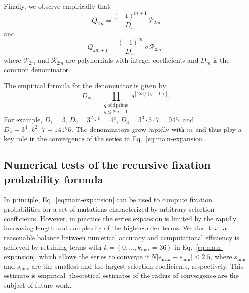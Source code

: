 \documentclass[9pt,twocolumn,twoside]{gsajnl}
\begin{document}

Finally, we observe empirically that
\begin{equation}
Q_{2m}
=
\frac{(-1)^{m+1}}{D_m}\,\mathcal P_{2m}
\end{equation}
and
\begin{equation}
Q_{2m+1}
=
\frac{(-1)^m}{D_m}\,a\,\mathcal R_{2m},
\end{equation}
where \(\mathcal P_{2m}\) and \(\mathcal R_{2m}\) are polynomials with integer
coefficients and  \(D_m\) is the common denominator.

The empirical formula for the denominator is given by
\begin{equation}
D_m=
\prod_{\substack{q\ \mathrm{odd\ prime}\\ q\leq 2m+1}}
q^{\left\lfloor 2m/(q-1)\right\rfloor}.
\end{equation}
For example, $D_1=3$, $D_2=3^2\cdot5=45$, $D_3=3^3\cdot5\cdot7=945$, and $D_4=3^4\cdot5^2\cdot7=14175$.
The denominators grow rapidly with $m$ and thus play a key role in the convergence of the series in Eq.~\eqref{eq:main-expansion}.


\subsection{Numerical tests of the recursive fixation probability formula}

In principle, Eq.~\eqref{eq:main-expansion} can be used to compute fixation probabilities for a set of mutations characterized by arbitrary selection coefficients. However, in practice
the series expansion is limited by the rapidly increasing length and complexity of the higher-order terms. %
We find that a reasonable balance between numerical accuracy and computational efficiency is achieved by retaining terms with $k = (0, \dots, k_\text{max}=36)$
in Eq.~\eqref{eq:main-expansion}, which allows the series to converge if $N |s_\text{max} - s_\text{min}| \le 2.5$, where $s_\text{min}$ and $s_\text{max}$ are the smallest and the largest selection coefficients,
respectively. This estimate is empirical; theoretical estimates of the radius of convergence are the subject of future work.
\end{document}
